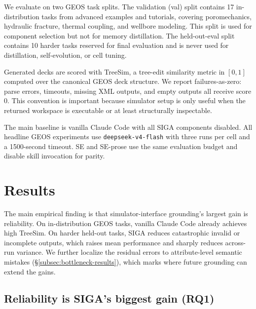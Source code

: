 \documentclass{article}
\begin{document}
We evaluate on two GEOS task splits. The validation (val) split contains 17 in-distribution tasks from advanced examples 
and tutorials, covering poromechanics, hydraulic fracture, thermal coupling, and wellbore modeling. This split is used 
for component selection but not for memory distillation. The held-out-eval split contains 10 harder tasks reserved 
for final evaluation and is never used for distillation, self-evolution, or cell tuning.

Generated decks are scored with TreeSim, a tree-edit similarity metric in $[0,1]$ computed over the canonical GEOS 
deck structure. We report failures-as-zero: parse errors, timeouts, missing XML outputs, and empty outputs all receive 
score 0. This convention is important because simulator setup is only useful when the returned workspace is executable 
or at least structurally inspectable.

The main baseline is vanilla Claude Code with all SIGA components disabled. All headline GEOS experiments use 
\texttt{deepseek-v4-flash} with three runs per cell and a 1500-second timeout. SE and SE-prose use the same evaluation budget 
and disable skill invocation for parity.



\section{Results}
\label{sec:results}

The main empirical finding is that simulator-interface grounding's largest gain is reliability. On in-distribution GEOS
tasks, vanilla Claude Code already achieves high TreeSim. On harder held-out tasks, SIGA reduces catastrophic invalid or
incomplete outputs, which raises mean performance and sharply reduces across-run variance. We further localize the
residual errors to attribute-level semantic mistakes (\S\ref{subsec:bottleneck-results}), which marks where future
grounding can extend the gains.

\subsection{Reliability is SIGA's biggest gain (RQ1)}
\label{subsec:quality}
\end{document}
